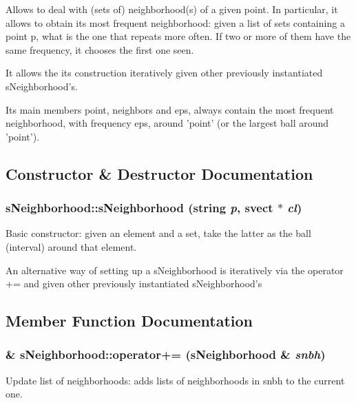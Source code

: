 Allows to deal with (sets of) neighborhood(s) of a given point. In particular, it allows to obtain its most frequent neighborhood: given a list of sets containing a point p, what is the one that repeats more often. If two or more of them have the same frequency, it chooses the first one seen.

It allows the its construction iteratively given other previously instantiated s\-Neighborhood's.

Its main members point, neighbors and eps, always contain the most frequent neighborhood, with frequency eps, around 'point' (or the largest ball around 'point'). 



\subsection{Constructor \& Destructor Documentation}
\subsubsection{\setlength{\rightskip}{0pt plus 5cm}s\-Neighborhood::s\-Neighborhood (string {\em p}, svect $\ast$ {\em cl})}\label{classsNeighborhood_a1}


Basic constructor: given an element and a set, take the latter as the ball (interval) around that element. 

An alternative way of setting up a s\-Neighborhood is iteratively via the operator += and given other previously instantiated s\-Neighborhood's

\subsection{Member Function Documentation}
\subsubsection{ \& s\-Neighborhood::operator+= ({\bf s\-Neighborhood} \& {\em snbh})}\label{classsNeighborhood_a6}


Update list of neighborhoods: adds lists of neighborhoods in snbh to the current one. 

